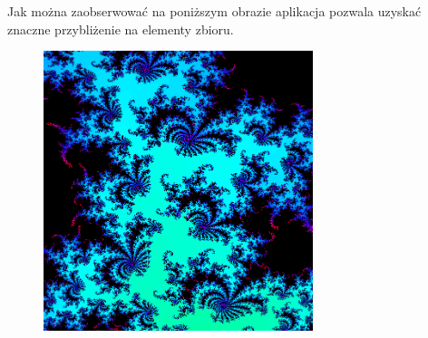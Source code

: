 Jak można zaobserwować na poniższym obrazie aplikacja pozwala uzyskać znaczne przybliżenie na elementy zbioru.
\begin{figure}[H]
    \centering
    \includegraphics[width = 0.7\textwidth]{img/ex3.png}
\end{figure}